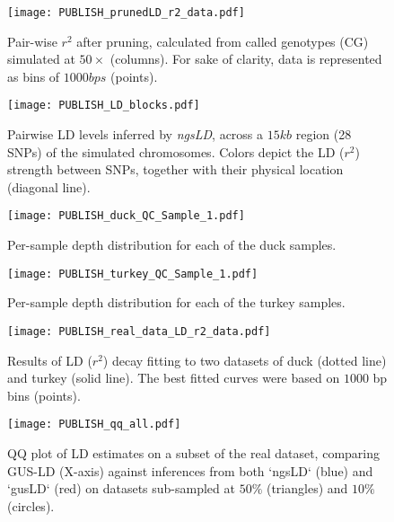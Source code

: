 \documentclass[a4paper]{article}
\begin{document}
\begin{figure}[H]
\centering
\texttt{[image: PUBLISH\_prunedLD\_r2\_data.pdf]}
\caption{Pair-wise $r^2$ after pruning, calculated from called genotypes (CG) simulated at $50\times$ (columns). For sake of clarity, data is represented as bins of $1000 bps$ (points).}
\label{SFig:r2pruned_data}
\end{figure}

\begin{figure}[H]
\centering
\texttt{[image: PUBLISH\_LD\_blocks.pdf]}
\caption{Pairwise LD levels inferred by \textit{ngsLD}, across a $15kb$ region (28 SNPs) of the simulated chromosomes. Colors depict the LD ($r^2$) strength between SNPs, together with their physical location (diagonal line).}
\label{SFig:LD_blocks}
\end{figure}

\begin{figure}[H]
\centering
\texttt{[image: PUBLISH\_duck\_QC\_Sample\_1.pdf]}
\caption{Per-sample depth distribution for each of the duck samples.}
\label{SFig:duck_Depth}
\end{figure}

\begin{figure}[H]
\centering
\texttt{[image: PUBLISH\_turkey\_QC\_Sample\_1.pdf]}
\caption{Per-sample depth distribution for each of the turkey samples.}
\label{SFig:turkey_Depth}
\end{figure}

\begin{figure}
\centering
\texttt{[image: PUBLISH\_real\_data\_LD\_r2\_data.pdf]}
\caption{Results of LD ($r^2$) decay fitting to two datasets of duck (dotted line) and turkey (solid line). The best fitted curves were based on $1000$ bp bins (points).}
\label{SFig:real_dataLD}
\end{figure}

\begin{figure}
\centering
\texttt{[image: PUBLISH\_qq\_all.pdf]}
\caption{QQ plot of LD estimates on a subset of the real dataset, comparing GUS-LD (X-axis) against inferences from both `ngsLD` (blue) and `gusLD` (red) on datasets sub-sampled at $50\%$ (triangles) and $10\%$ (circles).}
\label{SFig:qqplot}
\end{figure}


\newpage
\end{document}
